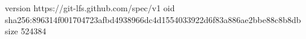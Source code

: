 version https://git-lfs.github.com/spec/v1
oid sha256:896314f001704723afbd4938966dc4d1554033922d6f83a886ae2bbe88c8b8db
size 524384
